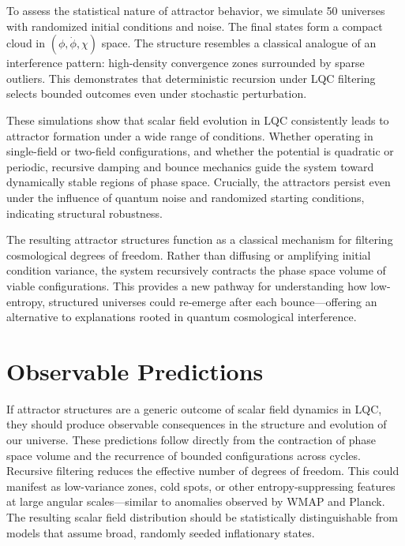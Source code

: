 \documentclass[12pt]{article}
\begin{document}
To assess the statistical nature of attractor behavior, we simulate 50 universes with randomized initial conditions and noise. The final states form a compact cloud in $(\phi, \dot{\phi}, \chi)$ space. The structure resembles a classical analogue of an interference pattern: high-density convergence zones surrounded by sparse outliers. This demonstrates that deterministic recursion under LQC filtering selects bounded outcomes even under stochastic perturbation.

These simulations show that scalar field evolution in LQC consistently leads to attractor formation under a wide range of conditions. Whether operating in single-field or two-field configurations, and whether the potential is quadratic or periodic, recursive damping and bounce mechanics guide the system toward dynamically stable regions of phase space. Crucially, the attractors persist even under the influence of quantum noise and randomized starting conditions, indicating structural robustness.

The resulting attractor structures function as a classical mechanism for filtering cosmological degrees of freedom. Rather than diffusing or amplifying initial condition variance, the system recursively contracts the phase space volume of viable configurations. This provides a new pathway for understanding how low-entropy, structured universes could re-emerge after each bounce—offering an alternative to explanations rooted in quantum cosmological interference.

\section{Observable Predictions}

If attractor structures are a generic outcome of scalar field dynamics in LQC, they should produce observable consequences in the structure and evolution of our universe. These predictions follow directly from the contraction of phase space volume and the recurrence of bounded configurations across cycles.
Recursive filtering reduces the effective number of degrees of freedom. This could manifest as low-variance zones, cold spots, or other entropy-suppressing features at large angular scales—similar to anomalies observed by WMAP and Planck\cite{Planck2020}. The resulting scalar field distribution should be statistically distinguishable from models that assume broad, randomly seeded inflationary states\cite{Remmen2013,Carroll2005}.
\end{document}
